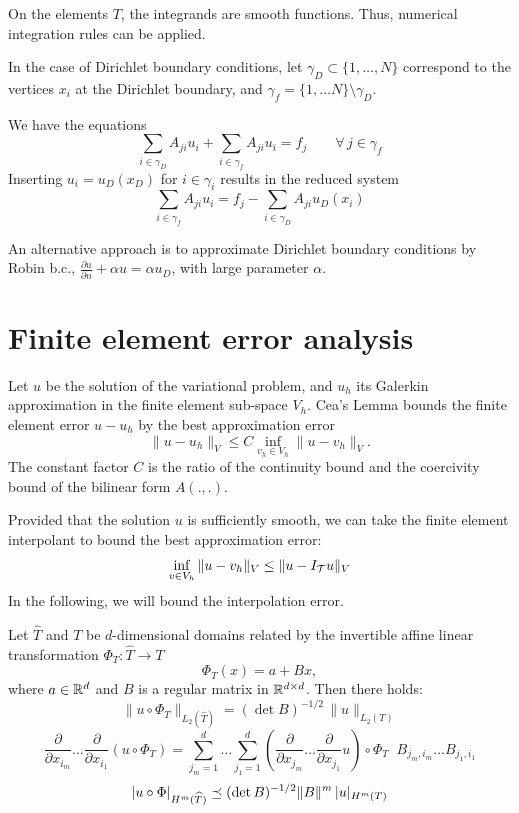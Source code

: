 \bigskip

On the elements $T$, the integrands are smooth functions. Thus, numerical
integration rules can be applied.

\bigskip

In the case of Dirichlet boundary conditions,
let $\gamma_D \subset \{ 1, \ldots , N \}$ correspond to the vertices $x_i$
at the Dirichlet boundary, and $\gamma_f = \{ 1, \ldots N \} \setminus \gamma_D$.

We have the equations
$$
\sum_{i \in \gamma_D} A_{ji} u_i + \sum_{i \in \gamma_f} A_{ji} u_i = f_j
\qquad \forall \, j \in \gamma_f
$$
Inserting $u_i = u_D(x_D)$ for $i \in \gamma_i$ results in the reduced system
$$
\sum_{i \in \gamma_f} A_{ji} u_i = f_j - \sum_{i \in \gamma_D} A_{ji} u_D(x_i)
$$

An alternative approach is to approximate Dirichlet boundary conditions by
Robin b.c., $\frac{\partial u}{\partial n} + \alpha u = \alpha u_D$, with large 
parameter $\alpha$.

\section{Finite element error analysis}
%
Let $u$ be the solution of the variational problem, and $u_h$ its
Galerkin approximation in the finite element sub-space $V_h$. Cea's Lemma 
bounds the finite element error $u - u_h$ by the 
best approximation error 
$$
\| u - u_h \|_V \leq C \inf_{v_h \in V_h} \| u - v_h \|_V.
$$
The constant factor $C$ is the ratio of the continuity bound and the
coercivity bound of the bilinear form $A(.,.)$.

Provided that the solution $u$ is sufficiently smooth,
we can take the finite element interpolant to bound the best approximation 
error:
$$
\inf_{v \in V_h} \| u - v_h \|_V \leq \| u - I_{\cal T} u \|_V
$$
In the following, we will bound the interpolation error.


\begin{lemma} Let $\widehat T$ and $T$ be $d$-dimensional domains related
by the invertible affine linear transformation $\Phi_T : \widehat T \rightarrow T $ 
$$
\Phi_T (x) = a + B x,
$$
where $a \in {\mathbb R}^d$ and $B$ is a regular matrix in ${\mathbb R}^{d\times d}$.
Then there holds:
\begin{equation}
\| u \circ \Phi_T \|_{L_2(\widehat T)} = (\det B)^{-1/2} \, \| u  \|_{L_2(T)}
\end{equation}
%
\begin{equation}
\frac{\partial}{\partial x_{i_m}} \ldots 
\frac{\partial}{\partial x_{i_1}} \left( u \circ \Phi_T \right) = 
\sum_{j_m = 1}^d \ldots \sum_{j_1=1}^d 
\left(
\frac{\partial}{\partial x_{j_m}} \ldots 
\frac{\partial}{\partial x_{j_1}} u \right) \circ \Phi_T \; \;
B_{j_m,i_m} \ldots B_{j_1, i_1}
\end{equation}
%
\begin{equation}
| u \circ \Phi |_{H^m(\widehat T)} \preceq (\det B)^{-1/2} \| B \|^m  \, | u |_{H^m(T)}
\end{equation}
\end{lemma}

